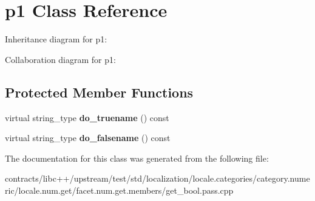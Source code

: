 \hypertarget{classp1}{}\section{p1 Class Reference}
\label{classp1}


Inheritance diagram for p1\+:


Collaboration diagram for p1\+:
\subsection*{Protected Member Functions}
\begin{DoxyCompactItemize}
\item 
\mbox{\label{classp1_a6bba4e27a7c41e17ac34e72e4a2df29e}} 
virtual string\+\_\+type {\bfseries do\+\_\+truename} () const
\item 
\mbox{\label{classp1_a56720a6d24b02413afe6033b5662748f}} 
virtual string\+\_\+type {\bfseries do\+\_\+falsename} () const
\end{DoxyCompactItemize}


The documentation for this class was generated from the following file\+:\begin{DoxyCompactItemize}
\item 
contracts/libc++/upstream/test/std/localization/locale.\+categories/category.\+numeric/locale.\+num.\+get/facet.\+num.\+get.\+members/get\+\_\+bool.\+pass.\+cpp\end{DoxyCompactItemize}
